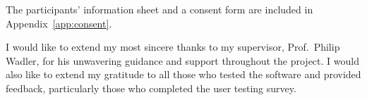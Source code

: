 \documentclass[../main.tex]{subfiles}
\begin{document}
\begin{preliminary}
\begin{ethics}
        The participants' information sheet and a consent form are included in
            Appendix~\ref{app:consent}.
        \\

        \standarddeclaration
    \end{ethics}

    \cleardoublepage
    \begin{acknowledgements}
        I would like to extend my most sincere thanks to my supervisor, Prof.~Philip
            Wadler, for his unwavering guidance and support throughout the project.
        I would also like to extend my gratitude to all those who tested the software
            and provided feedback, particularly those who completed the user testing
            survey.
    \end{acknowledgements}

    \cleardoublepage
    \tableofcontents
\end{preliminary}
\end{document}
